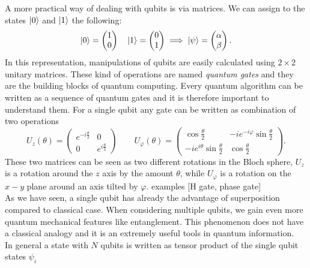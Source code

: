 A more practical way of dealing with qubits is via matrices. We can assign to the states $\ket{0}$ and $\ket{1}$ the following:
\begin{equation}
\ket{0} = \begin{pmatrix}
 1 \\
 0
\end{pmatrix} \quad
\ket{1} = \begin{pmatrix}
 0 \\
 1
\end{pmatrix} \implies \ket{\psi} = \begin{pmatrix}
 \alpha \\
 \beta
\end{pmatrix}.
\end{equation}
In this representation, manipulations of qubits are easily calculated using $2\times2$ unitary matrices. These kind of operations are named \emph{quantum gates} and they are the building blocks of quantum computing. Every quantum algorithm can be written as a sequence of quantum gates and it is therefore important to understand them. For a single qubit any gate can be written as combination of two operations \cite{hempel}
\begin{equation}
U_z(\theta) =  \begin{pmatrix}
 e^{-i\frac{\theta}{2}} & 0 \\
 0 & e^{i\frac{\theta}{2}}
\end{pmatrix} \qquad U_\varphi(\theta) = \begin{pmatrix}
\cos\frac{\theta}{2} & -i e^{-i\varphi}\sin\frac{\theta}{2} \\
-ie^{i\theta}\sin\frac{\theta}{2} & \cos\frac{\theta}{2}
\end{pmatrix}.
\end{equation}
These two matrices can be seen as two different rotations in the Bloch sphere, $U_z$ is a rotation around the $z$ axis by the amount $\theta$, while $U_\varphi$ is a rotation on the $x-y$ plane around an axis tilted by $\varphi$. examples [H gate, phase gate]\\
\newline
As we have seen, a single qubit has already the advantage of superposition compared to classical case. When considering multiple qubits, we gain even more quantum mechanical features like entanglement. This phenomenon does not have a classical analogy and it is an extremely useful tools in quantum information.\\
In general a state with $N$ qubits is written as tensor product of the single qubit states $\psi_i$
